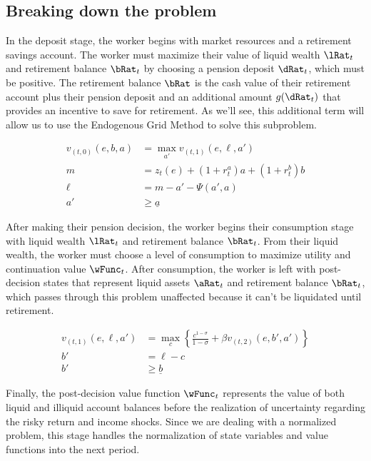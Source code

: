 \documentclass{article}
\begin{document}
\subsection{Breaking down the problem}

In the deposit stage, the worker begins with market resources and a retirement savings account. The worker must maximize their value of liquid wealth $\lRat_{t}$ and retirement balance $\bRat_{t}$ by choosing a pension deposit $\dRat_{t}$, which must be positive. The retirement balance $\bRat$ is the cash value of their retirement account plus their pension deposit and an additional amount $g(\dRat_{t})$ that provides an incentive to save for retirement. As we'll see, this additional term will allow us to use the Endogenous Grid Method to solve this subproblem.

\begin{align} \tag{1}
    v_{(t,0)}(e, b, a) & = \max_{a'} v_{(t,1)}(e, \ell, a')
    \\
    m                  & = z_t(e) + (1 + r_t^a)a + (1 + r_t^b)b
    \\
    \ell               & = m - a' - \Psi(a', a)
    \\
    a'                 & \geq \underline{a}
\end{align}

After making their pension decision, the worker begins their consumption stage with liquid wealth $\lRat_{t}$ and retirement balance $\bRat_{t}$. From their liquid wealth, the worker must choose a level of consumption to maximize utility and continuation value $\wFunc_{t}$. After consumption, the worker is left with post-decision states that represent liquid assets $\aRat_{t}$ and retirement balance $\bRat_{t}$, which passes through this problem unaffected because it can't be liquidated until retirement.

\begin{align} \tag{1}
    v_{(t,1)}(e, \ell, a') & = \max_{c} \left\{\frac{c^{1-\sigma}}{1-\sigma} + \beta v_{(t,2)}(e,b',a') \right\}
    \\
    b'                     & = \ell - c
    \\
    b'                     & \geq \underline{b}
\end{align}

Finally, the post-decision value function $\wFunc_{t}$ represents the value of both liquid and illiquid account balances before the realization of uncertainty regarding the risky return and income shocks. Since we are dealing with a normalized problem, this stage handles the normalization of state variables and value functions into the next period.
\end{document}
